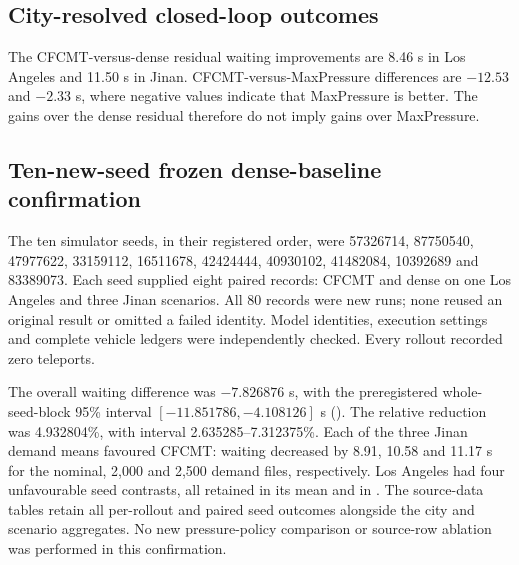 \subsection{City-resolved closed-loop outcomes}
\label{sec:supp-city-outcomes}

\begin{table}[htbp]
\caption{External closed-loop outcomes before equal-city aggregation.  Waiting
is the all-departed 3,600-s metric in seconds.  Incident entries are means over
the two closed-loop seeds within that city and policy.}
\label{tab:external-city-results}
\centering
\scriptsize
\resizebox{\textwidth}{!}{}
\end{table}

The CFCMT-versus-dense residual waiting improvements are 8.46 s in Los Angeles and
11.50 s in Jinan.  CFCMT-versus-MaxPressure differences are $-12.53$ and
$-2.33$ s, where negative values indicate that MaxPressure is better.  The
gains over the dense residual therefore do not imply gains over MaxPressure.

\subsection{Ten-new-seed frozen dense-baseline confirmation}
\label{sec:supp-v43-dense-fresh10}

The ten simulator seeds, in their registered order, were
57326714, 87750540, 47977622, 33159112, 16511678,
42424444, 40930102, 41482084, 10392689 and 83389073.
Each seed supplied eight paired records: CFCMT and dense on one Los Angeles
and three Jinan scenarios.  All 80 records were new runs; none reused an
original result or omitted a failed identity.  Model identities, execution
settings and complete vehicle ledgers were independently checked.  Every
rollout recorded zero teleports.

The overall waiting difference was $-7.826876$ s, with the preregistered
whole-seed-block 95\% interval $[-11.851786,-4.108126]$ s
().  The relative reduction was
4.932804\%, with interval 2.635285--7.312375\%.
Each of the three Jinan demand means favoured CFCMT: waiting decreased by
8.91, 10.58 and 11.17 s for the nominal, 2,000 and 2,500 demand files,
respectively.  Los Angeles had four unfavourable seed contrasts, all retained
in its mean and in .  The source-data tables retain
all per-rollout and paired seed outcomes alongside the city and scenario
aggregates.  No new pressure-policy comparison or source-row ablation was
performed in this confirmation.

